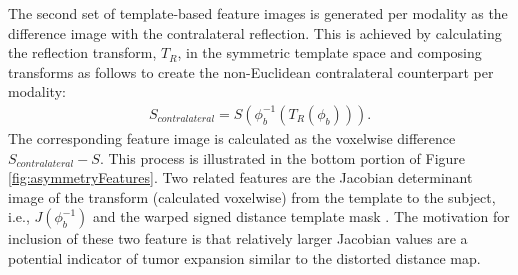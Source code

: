 \documentclass[preprint,authoryear,review,12pt]{elsarticle}
\begin{document}
The second
set of template-based feature images is generated per modality 
as the difference image with the contralateral reflection.  This is achieved by calculating the 
reflection transform, $T_R$, in the symmetric template space and composing transforms
as follows to create the non-Euclidean contralateral counterpart per modality:
\begin{align}
  S_{contralateral} = S\left( \phi_b^{-1}\left( T_R\left( \phi_b \right)\right)\right).
\end{align}
The corresponding feature image is calculated as the voxelwise difference $S_{contralateral} - S$.
This process is illustrated in the bottom portion of Figure \ref{fig:asymmetryFeatures}. Two 
related features are the Jacobian determinant image 
of the transform (calculated voxelwise) from the template to the subject, i.e., $J(\phi_b^{-1})$
and the warped signed distance template mask \citep{maurer2003}.
The motivation for inclusion of these two feature is that 
relatively larger Jacobian values are a potential indicator of tumor
expansion similar to the distorted distance map.
\end{document}

